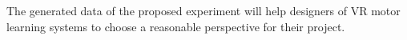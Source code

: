 The generated data of the proposed experiment will help designers of VR motor learning systems to choose a reasonable perspective for their project.




